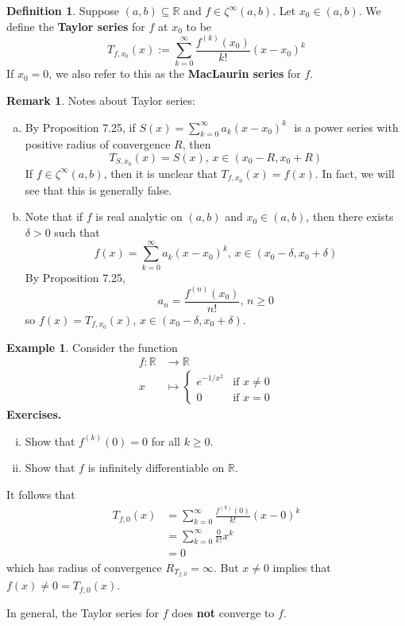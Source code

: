\documentclass[11pt]{article}
\theoremstyle{definition}
\newtheorem{defn}[thm]{Definition}
\newtheorem{exmp}[thm]{Example}
\newtheorem{remark}[thm]{Remark}
\newcommand{\mbR}{\ensuremath{\mathbb{R}}}
\newcommand{\powerseries}{\ensuremath{S(x) = \sum_{k=0}^\infty a_k (x - x_0)^k \text{ }}}
\begin{document}
\begin{defn}
Suppose $(a, b) \subseteq \mbR$ and $f \in \zeta^\infty(a, b)$. Let $x_0 \in (a, b)$. We define the \textbf{Taylor series} for $f$ at $x_0$ to be
$$T_{f, x_0}(x) := \sum_{k=0}^\infty \frac{f^{(k)}(x_0)}{k!} (x - x_0)^k$$
If $x_0 = 0$, we also refer to this as the \textbf{MacLaurin series} for $f$.
\end{defn}

\begin{remark}
Notes about Taylor series:
\begin{enumerate}[(a)] \vspace{-0.2cm}
\item By Proposition 7.25, if \powerseries is a power series with positive radius of convergence $R$, then
$$T_{S, x_0}(x) = S(x), \, x \in (x_0 - R, x_0 + R)$$
If $f \in \zeta^\infty(a, b)$, then it is unclear that $T_{f, x_0}(x) = f(x)$. In fact, we will see that this is generally false.
\item Note that if $f$ is real analytic on $(a, b)$ and $x_0 \in (a, b)$, then there exists $\delta > 0$ such that
$$f(x) = \sum_{k=0}^\infty a_k (x - x_0)^k, \, x \in (x_0 - \delta, x_0 + \delta)$$
By Proposition 7.25,
$$a_n = \frac{f^{(n)}(x_0)}{n!}, \, n \geq 0$$
so $f(x) = T_{f, x_0}(x)$, $x \in (x_0 - \delta, x_0 + \delta)$.
\end{enumerate}
\end{remark}

\begin{exmp}
Consider the function
\begin{align*}
f : \mbR & \to \mbR \\
x & \mapsto \begin{cases} e^{-1/x^2} & \text{if } x \ne 0 \\ 0 & \text{if } x = 0 \end{cases}
\end{align*}
\textbf{Exercises.}
\begin{enumerate}[(i)] \vspace{-0.2cm}
\item Show that $f^{(k)}(0) = 0$ for all $k \geq 0$.
\item Show that $f$ is infinitely differentiable on $\mbR$.
\end{enumerate}
It follows that
\begin{align*}
T_{f, 0}(x) & = \sum_{k=0}^\infty \frac{f^{(k)}(0)}{k!} (x - 0)^k \\
& = \sum_{k=0}^\infty \frac{0}{k!} x^k \\
& = 0
\end{align*}
which has radius of convergence $R_{T_{f, 0}} = \infty$. But $x \ne 0$ implies that $f(x) \ne 0 = T_{f, 0}(x)$.

In general, the Taylor series for $f$ does \textbf{not} converge to $f$.
\end{exmp}
\end{document}
